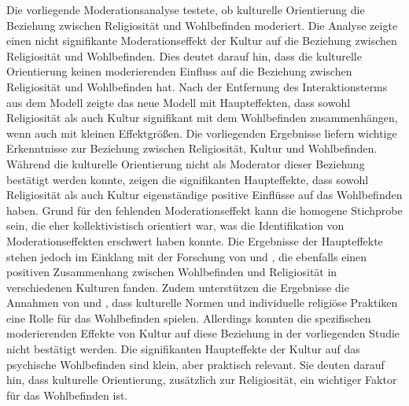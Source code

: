 Die vorliegende Moderationsanalyse testete, ob kulturelle Orientierung die Beziehung zwischen Religiosität und Wohlbefinden moderiert. Die Analyse zeigte einen nicht signifikante Moderationseffekt der Kultur auf die Beziehung zwischen Religiosität und Wohlbefinden. Dies deutet darauf hin, dass die kulturelle Orientierung keinen moderierenden Einfluss auf die Beziehung zwischen Religiosität und Wohlbefinden hat. Nach der Entfernung des Interaktionsterms aus dem Modell zeigte das neue Modell mit Haupteffekten, dass sowohl Religiosität als auch Kultur signifikant mit dem Wohlbefinden zusammenhängen, wenn auch mit kleinen Effektgrößen. Die vorliegenden Ergebnisse liefern wichtige Erkenntnisse zur Beziehung zwischen Religiosität, Kultur und Wohlbefinden. Während die kulturelle Orientierung nicht als Moderator dieser Beziehung bestätigt werden konnte, zeigen die signifikanten Haupteffekte, dass sowohl Religiosität als auch Kultur eigenständige positive Einflüsse auf das Wohlbefinden haben.
Grund für den fehlenden Moderationseffekt kann die homogene Stichprobe sein, die eher kollektivistisch orientiert war, was die Identifikation von Moderationseffekten erschwert haben konnte.
Die Ergebnisse der Haupteffekte stehen jedoch im Einklang mit der Forschung von \textcite{GrahamCrown2014} und \textcite{TayLiMyersDiener2014}, die ebenfalls einen positiven Zusammenhang zwischen Wohlbefinden und Religiosität in verschiedenen Kulturen fanden. Zudem unterstützen die Ergebnisse die Annahmen von \textcite{HoogeveenEtAl2023} und \textcite{FernándezRosell2022}, dass kulturelle Normen und individuelle religiöse Praktiken eine Rolle für das Wohlbefinden spielen. Allerdings konnten die spezifischen moderierenden Effekte von Kultur auf diese Beziehung in der vorliegenden Studie nicht bestätigt werden.
Die signifikanten Haupteffekte der Kultur auf das psychische Wohlbefinden sind klein, aber praktisch relevant. Sie deuten darauf hin, dass kulturelle Orientierung, zusätzlich zur Religiosität, ein wichtiger Faktor für das Wohlbefinden ist. %


